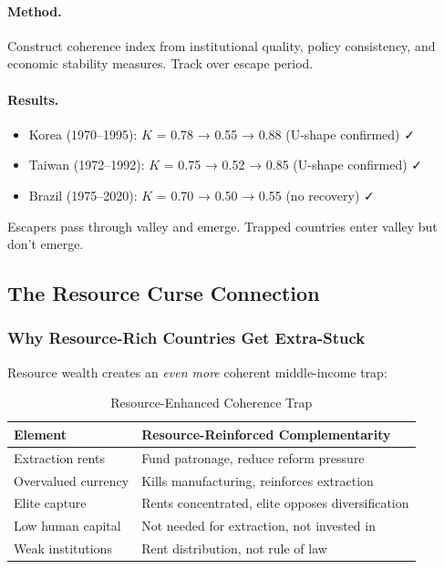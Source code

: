 \paragraph{Method.}
Construct coherence index from institutional quality, policy consistency, 
and economic stability measures. Track over escape period.

\paragraph{Results.}
\begin{itemize}
    \item Korea (1970--1995): $K$ = 0.78 → 0.55 → 0.88 (U-shape confirmed) ✓
    \item Taiwan (1972--1992): $K$ = 0.75 → 0.52 → 0.85 (U-shape confirmed) ✓
    \item Brazil (1975--2020): $K$ = 0.70 → 0.50 → 0.55 (no recovery) ✓
\end{itemize}

Escapers pass through valley and emerge. Trapped countries enter valley 
but don't emerge.

\subsection{The Resource Curse Connection}

\subsubsection{Why Resource-Rich Countries Get Extra-Stuck}

Resource wealth creates an \emph{even more} coherent middle-income trap:

\begin{table}[htbp]
\centering
\caption{Resource-Enhanced Coherence Trap}
\label{tab:resource-trap}
\begin{tabular}{@{}ll@{}}
\toprule
\textbf{Element} & \textbf{Resource-Reinforced Complementarity} \\
\midrule
Extraction rents & Fund patronage, reduce reform pressure \\
Overvalued currency & Kills manufacturing, reinforces extraction \\
Elite capture & Rents concentrated, elite opposes diversification \\
Low human capital & Not needed for extraction, not invested in \\
Weak institutions & Rent distribution, not rule of law \\
\bottomrule
\end{tabular}
\end{table}


